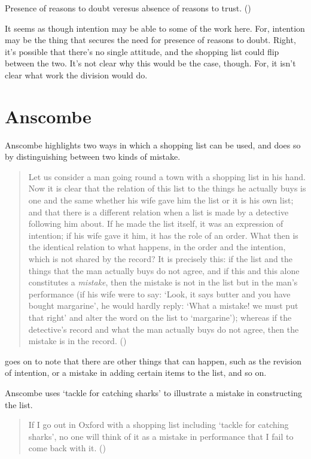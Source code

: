 \documentclass[10pt]{article}
\begin{document}
Presence of reasons to doubt veresus absence of reasons to trust. (\cite[703]{Weatherson:2015aa})

It seems as though intention may be able to some of the work here.
For, intention may be the thing that secures the need for presence of reasons to doubt.
Right, it's possible that there's no single attitude, and the shopping list could flip between the two.
It's not clear why this would be the case, though.
For, it isn't clear what work the division would do.



\newpage

\section{Anscombe}
\label{sec:anscombe}

Anscombe highlights two ways in which a shopping list can be used, and does so by distinguishing between two kinds of mistake.

\begin{quote}
  Let us consider a man going round a town with a shopping list in his hand.
  Now it is clear that the relation of this list to the things he actually buys is one and the same whether his wife gave him the list or it is his own list; and that there is a different relation when a list is made by a detective following him about.
  If he made the list itself, it was an expression of intention; if his wife gave it him, it has the role of an order.
  What then is the identical relation to what happens, in the order and the intention, which is not shared by the record?
  It is precisely this:
  if the list and the things that the man actually buys do not agree, and if this and this alone constitutes a \emph{mistake}, then the mistake is not in the list but in the man's performance (if his wife were to say: `Look, it says butter and you have bought margarine', he would hardly reply: `What a mistake! we must put that right' and alter the word on the list to `margarine'); whereas if the detective’s record and what the man actually buys do not agree, then the mistake is in the record.\nolinebreak
  \mbox{}\hfill\mbox(\citeyear[56]{Anscombe:1957aa})
\end{quote}

\citeauthor{Anscombe:1957aa} goes on to note that there are other things that can happen, such as the revision of intention, or a mistake in adding certain items to the list, and so on.

Anscombe uses `tackle for catching sharks' to illustrate a mistake in constructing the list.
\begin{quote}
  If I go out in Oxford with a shopping list including `tackle for catching sharks', no one will think of it as a mistake in performance that I fail to come back with it.\nolinebreak
  \mbox{}\hfill\mbox(\citeyear[56]{Anscombe:1957aa})
\end{quote}
\end{document}
